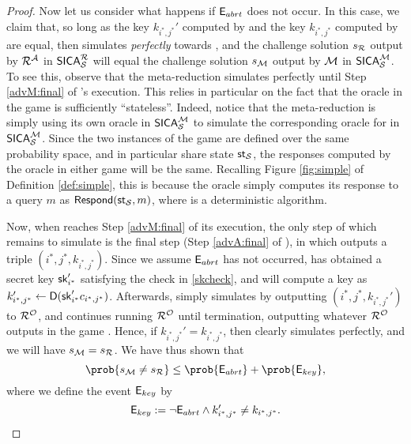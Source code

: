 \begin{proof}
  Now let us consider what happens if \(\mathsf{E}_{abrt}\) does not occur.
  In this case, we claim that, so long as the key
  \(k_{i^{*},j^{*}}'\) computed by \redM
  and the key \(k_{i^{*},j^{*}}\) computed by \advA
  are equal,
  then \redM simulates \advA \emph{perfectly}
  towards \redR,
  and the challenge solution \(s_{\redR}\) output by \(\redR^{\advA}\) in \(\SICA_{\Simple}^{\redR}\)
  will equal the challenge solution \(s_{\mathcal{M}}\) output by \(\mathcal{M}\)
  in \(\mathsf{SICA}_{\mathcal{S}}^{\mathcal{M}}\).
  To see this, observe that the meta-reduction \redM simulates \advA
  perfectly until Step \ref{advM:final} of \redM's execution.
  This relies in particular on the fact that the oracle \oracle
  in the \SICA game is sufficiently ``stateless''.
  Indeed, notice that the meta-reduction \redM is simply
  using its own oracle \oracle in \(\mathsf{SICA}_{\mathcal{S}}^{\mathcal{M}}\)
  to simulate the corresponding oracle for \redR in \(\mathsf{SICA}_{\mathcal{S}}^{\mathcal{M}}\).
  Since the two instances of the \SICA game are defined over the same probability space,
  and in particular share state \(\mathsf{st}_{\mathcal{S}}\),
  the responses computed by the oracle \oracle
  in either game will be the same.
  Recalling Figure \ref{fig:simple} of Definition \ref{def:simple},
  this is because the oracle \oracle simply computes its response to a query \(m\)
  as \(\mathsf{Respond}(\mathsf{st}_{\mathcal{S}},m)\), where \Respond is a deterministic algorithm.

  Now, when \redM reaches Step \ref{advM:final} of its execution,
  the only step of \advA which remains to simulate is the
  final step (Step \ref{advA:final} of \advA), in which \advA outputs
  a triple \((i^{*},j^{*},k_{i^{*},j^{*}})\).
  Since we assume \(\mathsf{E}_{abrt}\) has not occurred,
  \redM has obtained a secret key \(\mathsf{sk}_{i^{*}}'\)
  satisfying the check in \eqref{skcheck},
  and will compute a key as \(k_{i^{*},{j^{*}}}' \leftarrow \mathsf{D}(\mathsf{sk}_{i^{*}}'c_{i^{*},j^{*}})\).
  Afterwards, \redM simply simulates \advA
  by outputting \((i^{*},j^{*}, k_{i^{*},j^{*}}')\) to \(\redR^{\oracle}\),
  and continues running \(\redR^{\oracle}\)
  until termination, outputting whatever \(\redR^{\oracle}\)
  outputs in the game \SICA.
  Hence, if \(k_{i^{*},j^{*}}' = k_{i^{*},j^{*}}\),
  then clearly \redM simulates \advA perfectly,
  and we will have \(s_{\redM} = s_{\redR}\).
  We have thus shown that
  \[
    \prob{s_{\redM} \ne s_{\redR}} \le \prob{\eventE_{abrt}} + \prob{\eventE_{key}},
  \]
  where we define the event \(\mathsf{E}_{key}\) by
  \[
    \mathsf{E}_{key} := \neg \mathsf{E}_{abrt} \land k_{i^{*},j^{*}}' \ne k_{i^{*},j^{*}}.
  \]


\end{proof}
